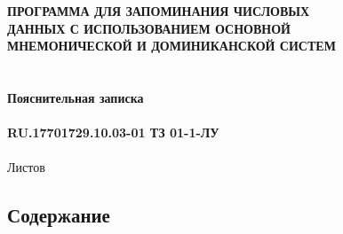 \documentclass[draft]{article}
\begin{document}
\bigskip
\begin{center}
\topskip=0pt
\vspace*{\fill}
\textbf{ПРОГРАММА ДЛЯ ЗАПОМИНАНИЯ ЧИСЛОВЫХ\\
 ДАННЫХ С ИСПОЛЬЗОВАНИЕМ ОСНОВНОЙ\\
 МНЕМОНИЧЕСКОЙ И ДОМИНИКАНСКОЙ СИСТЕМ\\
~\\
~\\
Пояснительная записка\\
~\\
RU.17701729.10.03-01 ТЗ 01-1-ЛУ}\\
~\\
Листов \ztotpages\\
\vspace*{\fill}
\end{center}
\begin{center}
\end{center}
\newpage
\begin{center}
\section {Содержание}
\tableofcontents
\end{center}
\newpage
\end{document}
